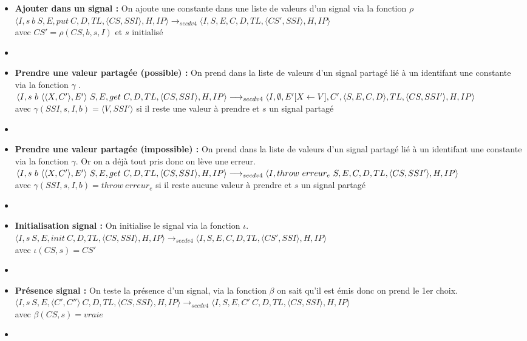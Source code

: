 \documentclass[10pt,a4paper]{report}
\begin{document}
\begin{enumerate}
\begin{itemize}
  \item[] \textbf{Ajouter dans un signal :} On ajoute une constante dans une liste de valeurs d'un signal via la fonction $\rho$
    \smallbreak
    $\langle I,s~b~S,E,put~C,D,TL,\langle CS,SSI\rangle,H,IP\rangle \longrightarrow_{secdv4} \langle I,S,E,C,D,TL,\langle CS',SSI\rangle,H,IP\rangle$ \\
    avec $CS' = \rho(CS,b,s,I)$ et $s$ initialisé
  \item[]
    
  \item[] \textbf{Prendre une valeur partagée (possible) :} On prend dans la liste de valeurs d'un signal partagé lié à un identifant une constante via la fonction $\gamma$ .
    \smallbreak
    $\langle I,s~b~\langle\langle X,C'\rangle,E'\rangle~S,E,get~C,D,TL,\langle CS,SSI\rangle,H,IP\rangle 
    \\\longrightarrow_{secdv4} \langle I,\emptyset,E'[X \leftarrow V],C',\langle S,E,C,D\rangle,TL,\langle CS,SSI'\rangle,H,IP\rangle$\\
    avec $ \gamma(SSI,s,I,b) = \langle V,SSI'\rangle$ si il reste une valeur à prendre et $s$ un signal partagé
  \item[]
    
  \item[] \textbf{Prendre une valeur partagée (impossible) :} On prend dans la liste de valeurs d'un signal partagé lié à un identifant une constante via la fonction $\gamma$. Or on a déjà tout pris donc on lève une erreur.
    \smallbreak 
    $\langle I,s~b~\langle\langle X,C'\rangle,E'\rangle~S,E,get~C,D,TL,\langle CS,SSI\rangle,H,IP\rangle 
    \\\longrightarrow_{secdv4} \langle I,throw~erreur_{e}~S,E,C,D,TL,\langle CS,SSI'\rangle,H,IP\rangle$\\
    avec $ \gamma(SSI,s,I,b) = throw~erreur_{e}$ si il reste aucune valeur à prendre et $s$ un signal partagé
  \item[]
    
  \item[] \textbf{Initialisation signal :} On initialise le signal via la fonction $\iota$.
    \smallbreak 
    $\langle I,s~S,E,init~C,D,TL,\langle CS,SSI\rangle,H,IP\rangle 
    \longrightarrow_{secdv4} \langle I,S,E,C,D,TL,\langle CS',SSI\rangle,H,IP\rangle$\\
    avec $\iota(CS,s) = CS'$
  \item[]	
    
  \item[] \textbf{Présence signal :} On teste la présence d'un signal, via la fonction $\beta$ on sait qu'il est émis donc on prend le 1er choix.
    \smallbreak
    $\langle I,s~S,E,\langle C',C''\rangle~C,D,TL,\langle CS,SSI\rangle,H,IP\rangle 
    \longrightarrow_{secdv4} \langle I,S,E,C'~C,D,TL,\langle CS,SSI\rangle,H,IP\rangle$ \\
    avec $\beta(CS,s) = vraie$
  \item[]
    

\end{itemize}
\end{enumerate}
\end{document}
